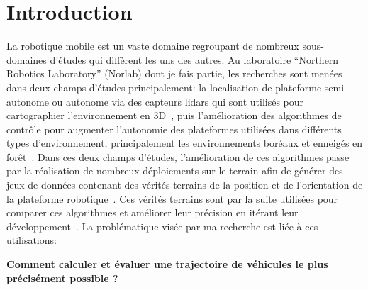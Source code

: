 \section{Introduction}
\label{sec:introduction}

La robotique mobile est un vaste domaine regroupant de nombreux sous-domaines d'études qui diffèrent les uns des autres. 
Au laboratoire ``Northern Robotics Laboratory'' (Norlab) dont je fais partie, les recherches sont menées dans deux champs d'études principalement: la localisation de plateforme semi-autonome ou autonome via des capteurs lidars qui sont utilisés pour cartographier l'environnement en 3D~\cite{Vlad2022}, puis l'amélioration des algorithmes de contrôle pour augmenter l'autonomie des plateformes utilisées dans différents types d'environnement, principalement les environnements boréaux et enneigés en forêt~\cite{Baril2020}.
Dans ces deux champs d'études, l'amélioration de ces algorithmes passe par la réalisation de nombreux déploiements sur le terrain afin de générer des jeux de données contenant des vérités terrains de la position et de l'orientation de la plateforme robotique~\cite{Baril2022}.
Ces vérités terrains sont par la suite utilisées pour comparer ces algorithmes et améliorer leur précision en itérant leur développement~\cite{Chahine2021}.
La problématique visée par ma recherche est liée à ces utilisations:
\begin{center}
\textbf{Comment calculer et évaluer une trajectoire de véhicules le plus précisément possible ?}
\end{center}

